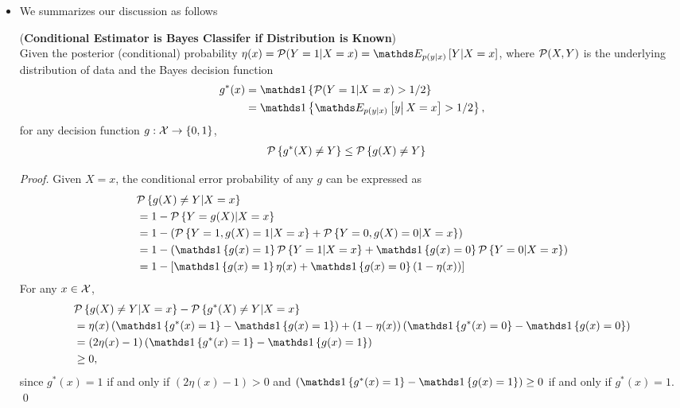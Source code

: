 \documentclass[11pt]{article}
\begin{document}
\begin{itemize}
\item We summarizes our discussion as follows
 \begin{proposition} (\textbf{Conditional Estimator is Bayes Classifer if Distribution is Known}) \citep{devroye2013probabilistic}\\
Given the posterior (conditional) probability $\eta(x)= \cP(Y=1|X=x)= \E{p(y|x)}{Y| X=x}$, where ${\mathcal P}(X,Y)$ is the underlying distribution of data and the Bayes decision function  
\begin{align*}
g^{*}(x) &= \ind{\cP(Y=1| X=x)>1/2}\\
&=  \ind{\E{p(y|x)}{y\big|\,X=x}>1/2},
\end{align*}
for any decision function $g: {\mathcal X} \rightarrow \left\{0,1\right\}$, 
\begin{align*}
{\mathcal P}\left\{g^{*}(X)\neq Y\right\} &\le {\mathcal P}\left\{g(X) \neq Y\right\}
\end{align*}
\end{proposition}
\begin{proof}
Given $X=x$, the conditional error probability of any $g$ can be expressed as
\begin{align}
&\cP\set{g(X) \neq Y| X=x}  \nonumber\\
&= 1- \cP\set{ Y= g(X)| X=x }\nonumber\\
&=1- \paren{\cP\set{Y=1, g(X)=1 | X=x}+ \cP\set{Y=0, g(X)=0 | X=x}}\nonumber\\
&=1- \paren{ \ind{g(x)=1}\cP\set{ Y=1 | X=x } + \ind{g(x)=0}\cP\set{ Y=0 | X=x }    } \nonumber\\
&=1- \brac{ \ind{g(x)=1} \eta(x) +  \ind{g(x)=0}\paren{1- \eta(x)}}  \label{expr: Bayes_error_expr}
\end{align}
For any $x\in {\mathcal X}$, 
\begin{align*}
&\cP\set{g(X)\neq Y| X=x} - \cP\set{g^{*}(X)\neq Y| X=x}\\
&= \eta(x)\paren{  \ind{g^{*}(x)=1} -  \ind{g(x)=1}  }+ (1-\eta(x))\paren{\ind{g^{*}(x)=0} -  \ind{g(x)=0}}\\
&= (2\eta(x)-1)\paren{ \ind{g^{*}(x)=1} -  \ind{g(x)=1}  }\\
&\ge 0,
\end{align*}
since $g^{*}(x)=1$ if and only if $(2\eta(x)-1)>0$ and $\paren{ \ind{g^{*}(x)=1} -  \ind{g(x)=1}  }\ge 0$ if and only if $g^{*}(x)=1$. \qed
\end{proof}


\end{itemize}
\end{document}
